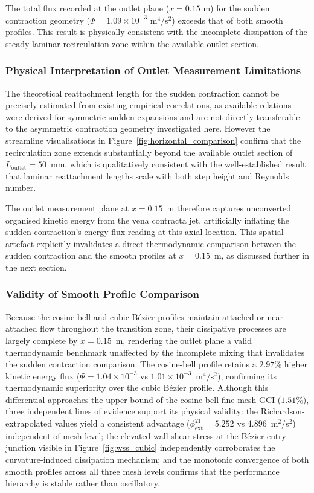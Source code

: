 \documentclass[12pt, a4paper]{article}
\begin{document}
The total flux recorded at the outlet plane ($x = 0.15$ m) for the 
sudden contraction geometry ($\Psi = 1.09 \times 10^{-3}$ m$^4$/s$^2$) exceeds 
that of both smooth profiles. This result is physically consistent with the 
incomplete dissipation of the steady laminar recirculation zone within the 
available outlet section.

\subsubsection{Physical Interpretation of Outlet Measurement Limitations}

The theoretical reattachment length for the sudden contraction cannot be precisely estimated from existing empirical correlations, as available relations \cite{kotsovinos1990} were derived for symmetric sudden expansions and are not directly transferable to the 
asymmetric contraction geometry investigated here. However the streamline visualisations in Figure~\ref{fig:horizontal_comparison} confirm that the recirculation 
zone extends substantially beyond the available outlet section of $L_{\text{outlet}} = 50$~mm, which is qualitatively consistent with the 
well-established result that laminar reattachment lengths scale with both step height and Reynolds number.

The outlet measurement plane at $x = 0.15$~m therefore captures unconverted organised kinetic energy from the vena contracta jet, artificially inflating the sudden contraction's energy flux reading at this axial location. This spatial artefact explicitly invalidates a direct thermodynamic comparison between the sudden contraction and the smooth profiles at $x = 0.15$~m, as discussed further in the next section.


\subsubsection{Validity of Smooth Profile Comparison}

Because the cosine-bell and cubic B\'{e}zier profiles maintain attached 
or near-attached flow throughout the transition zone, their dissipative 
processes are largely complete by $x = 0.15$~m, rendering the outlet 
plane a valid thermodynamic benchmark unaffected by the incomplete 
mixing that invalidates the sudden contraction comparison. The 
cosine-bell profile retains a $2.97\%$ higher kinetic energy flux 
($\Psi = 1.04 \times 10^{-3}$ vs $1.01 \times 10^{-3}$~m$^4$/s$^2$), 
confirming its thermodynamic superiority over the cubic B\'{e}zier 
profile. Although this differential approaches the upper bound of the 
cosine-bell fine-mesh GCI ($1.51\%$), three independent lines of 
evidence support its physical validity: the Richardson-extrapolated 
values yield a consistent advantage ($\phi^{21}_{\text{ext}} = 5.252$ 
vs $4.896$~m$^2$/s$^2$) independent of mesh level; the elevated wall 
shear stress at the B\'{e}zier entry junction visible in 
Figure~\ref{fig:wss_cubic} independently corroborates the curvature-induced 
dissipation mechanism; and the monotonic convergence of both smooth 
profiles across all three mesh levels confirms that the performance 
hierarchy is stable rather than oscillatory.
\end{document}
